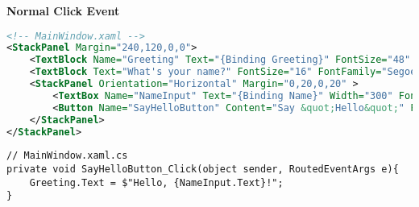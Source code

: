 \textbf{Normal Click Event}
\begin{lstlisting}[language=xml]
<!-- MainWindow.xaml -->
<StackPanel Margin="240,120,0,0">
	<TextBlock Name="Greeting" Text="{Binding Greeting}" FontSize="48" FontFamily="Segoe UI Light"   Margin="0,0,0,40" />
	<TextBlock Text="What's your name?" FontSize="16" FontFamily="Segoe UI Light" />
	<StackPanel Orientation="Horizontal" Margin="0,20,0,20" >
		<TextBox Name="NameInput" Text="{Binding Name}" Width="300" FontSize="16" 		 VerticalContentAlignment="Center" FontFamily="Segoe UI" BorderThickness="0" 		 HorizontalAlignment="Left" Margin="0,0,10,0"/>
		<Button Name="SayHelloButton" Content="Say &quot;Hello&quot;" FontSize="16" FontFamily="Segoe UI Light" 	Background="#0065A3" BorderThickness="2" BorderBrush="White" Foreground="White" 	Padding="4" IsDefault="True" Click="SayHelloButton_Click" />
	</StackPanel>
</StackPanel>
\end{lstlisting}
\begin{lstlisting}
// MainWindow.xaml.cs
private void SayHelloButton_Click(object sender, RoutedEventArgs e){
	Greeting.Text = $"Hello, {NameInput.Text}!";
}
\end{lstlisting}
